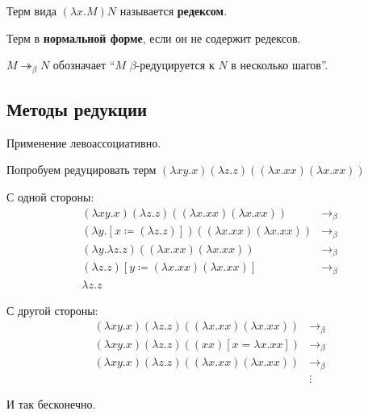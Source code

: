\begin{definition}
    Терм вида \((\lambda x.M)N\) называется \textbf{редексом}.
\end{definition}
\begin{definition}
    Терм в \textbf{нормальной форме}, если он не содержит редексов.
\end{definition}

\begin{obozn}
    \(M \twoheadrightarrow_\beta N\) обозначает ``\(M\) \(\beta\)-редуцируется к \(N\) в несколько шагов''.
\end{obozn}

\? %

\subsection{Методы редукции}

\begin{remark}
    Применение левоассоциативно.
\end{remark}

\begin{example}
    Попробуем редуцировать терм \((\lambda xy.x)(\lambda z.z)((\lambda x.x x)(\lambda x.x x))\)

    С одной стороны:
    \begin{align*}
        (\lambda xy.x)(\lambda z.z)((\lambda x.x x)(\lambda x.x x))             & \to_\beta \\
        (\lambda y.[x \coloneqq (\lambda z.z)])((\lambda x.x x)(\lambda x.x x)) & \to_\beta \\
        (\lambda y.\lambda z.z)((\lambda x.x x)(\lambda x.x x))                 & \to_\beta \\
        (\lambda z.z)[y \coloneqq (\lambda x.x x)(\lambda x.x x)]               & \to_\beta \\
        \lambda z.z
    \end{align*}

    С другой стороны:
    \begin{align*}
        (\lambda xy.x)(\lambda z.z)((\lambda x.x x)(\lambda x.x x)) & \to_\beta \\
        (\lambda xy.x)(\lambda z.z)((x x)[x = \lambda x.x x])       & \to_\beta \\
        (\lambda xy.x)(\lambda z.z)((\lambda x.x x)(\lambda x.x x)) & \to_\beta \\
                                                                    & \vdots
    \end{align*}

    И так бесконечно.
\end{example}

